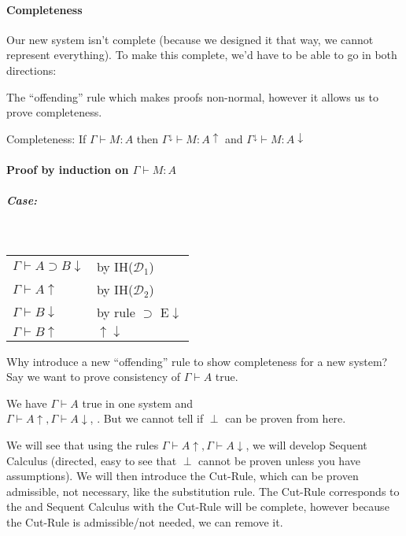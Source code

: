 \documentclass[12 pt]{article}
\begin{document}
        \paragraph{Completeness} Our new system isn't complete
        (because we designed it that way, we cannot represent
        everything). To make this complete, we'd have to be able to go
        in both directions:
        \begin{prooftree}
        \end{prooftree}
        The ``offending'' rule which makes proofs non-normal, however
        it allows us to prove completeness.

        Completeness: If $\Gamma \vdash M : A$ then
        $\Gamma^{\downarrow} \vdash M : A \uparrow$ and
        $\Gamma^{\downarrow} \vdash M : A \downarrow$

        \paragraph{Proof by induction on $\Gamma \vdash M : A$}
        \subparagraph{Case:} \DP
        \\
        \begin{tabular}{l l}
          $\Gamma \vdash A \supset B \downarrow$& by IH($\mathcal{D}_1$)
          \\ $\Gamma \vdash A \uparrow$ & by IH($\mathcal{D}_2$)
          \\ $\Gamma \vdash B \downarrow$ & by rule $\supset$ E$\downarrow$
          \\ $\Gamma \vdash B \uparrow$ & $\uparrow \downarrow$
        \end{tabular}
        
        Why introduce a new ``offending'' rule to show completeness
        for a new system? Say we want to prove consistency of $\Gamma
        \vdash A$ true.

        We have $\Gamma \vdash A$ true in one system and
        \\ $\Gamma \vdash A \uparrow, \Gamma \vdash A \downarrow$,
        \DP. But we cannot tell if $\perp$ can be proven
        from here.

        We will see that using the rules $\Gamma \vdash A \uparrow,
        \Gamma \vdash A \downarrow$, we will develop Sequent Calculus
        (directed, easy to see that $\perp$ cannot be proven unless
        you have assumptions). We will then introduce the Cut-Rule,
        which can be proven admissible, not necessary, like the
        substitution rule. The Cut-Rule corresponds to the \DP and Sequent Calculus with the Cut-Rule will
        be complete, however because the Cut-Rule is admissible/not
        needed, we can remove it.
\end{document}
